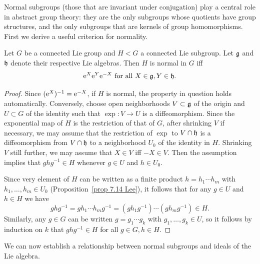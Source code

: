 Normal subgroups (those that are invariant under conjugation) play a central role in abstract group theory: they are the only subgroups whose quotients have group structures, and the only subgroups that are kernels of group homomorphisms. First we derive a useful criterion for normality.

\begin{lem}\label{lem 20.23 Lee}
    Let $G$ be a connected Lie group and $H<G$ a connected Lie subgroup. Let $\mathfrak{g}$ and $\mathfrak{h}$ denote their respective Lie algebras. Then $H$ is normal in $G$ iff
    \[\mathrm{e}^X \mathrm{e}^Y \mathrm{e}^{-X} \text{ for all }X\in \mathfrak{g},Y\in\mathfrak{h}.\]
\end{lem}
\begin{proof}
    Since $(\mathrm{e}^X)^{-1}=\mathrm{e}^{-X}$, if $H$ is normal, the property in question holds automatically. Conversely, choose open neighborhoods $V\subset \mathfrak{g}$ of the origin and $U\subset G$ of the identity such that $\exp:V\to U$ is a diffeomorphism. Since the exponential map of $H$ is the restriction of that of $G$, after shrinking $V$ if necessary, we may assume that the restriction of $\exp$ to $V\cap \mathfrak{h}$ is a diffeomorphism from $V\cap \mathfrak{h}$ to a neighborhood $U_0$ of the identity in $H$. Shrinking $V$ still further, we may assume that $X\in V$ iff $-X\in V$. Then the assumption implies that $ghg^{-1}\in H$ whenever $g\in U$ and $h\in U_0$.

    Since very element of $H$ can be written as a finite product $h=h_1\cdots h_m$ with $h_1,\ldots, h_m\in U_0$ (Proposition~\ref{prop 7.14 Lee}), it follows that for any $g\in U$ and $h\in H$ we have
    \[ghg^{-1}=gh_1\cdots h_m g^{-1}=(gh_1g^{-1})\cdots (gh_m g^{-1})\in H.\]
    Similarly, any $g\in G$ can be written $g=g_1\cdots g_k$ with $g_1,\ldots, g_k\in U$, so it follows by induction on $k$ that $ghg^{-1}\in H$ for all $g\in G,h\in H$.
\end{proof}


We can now establish a relationship between normal subgroups and ideals of the Lie algebra.

